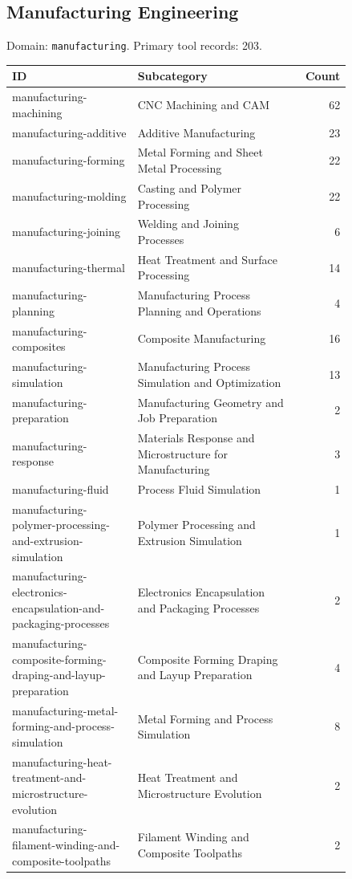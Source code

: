 \subsection{Manufacturing Engineering}
\noindent Domain: \texttt{manufacturing}. Primary tool records: 203.
\begin{longtable}{p{0.37\linewidth}p{0.47\linewidth}r}
ID & Subcategory & Count\\\hline\endhead
manufacturing-machining & CNC Machining and CAM & 62\\
manufacturing-additive & Additive Manufacturing & 23\\
manufacturing-forming & Metal Forming and Sheet Metal Processing & 22\\
manufacturing-molding & Casting and Polymer Processing & 22\\
manufacturing-joining & Welding and Joining Processes & 6\\
manufacturing-thermal & Heat Treatment and Surface Processing & 14\\
manufacturing-planning & Manufacturing Process Planning and Operations & 4\\
manufacturing-composites & Composite Manufacturing & 16\\
manufacturing-simulation & Manufacturing Process Simulation and Optimization & 13\\
manufacturing-preparation & Manufacturing Geometry and Job Preparation & 2\\
manufacturing-response & Materials Response and Microstructure for Manufacturing & 3\\
manufacturing-fluid & Process Fluid Simulation & 1\\
manufacturing-polymer-processing-and-extrusion-simulation & Polymer Processing and Extrusion Simulation & 1\\
manufacturing-electronics-encapsulation-and-packaging-processes & Electronics Encapsulation and Packaging Processes & 2\\
manufacturing-composite-forming-draping-and-layup-preparation & Composite Forming Draping and Layup Preparation & 4\\
manufacturing-metal-forming-and-process-simulation & Metal Forming and Process Simulation & 8\\
manufacturing-heat-treatment-and-microstructure-evolution & Heat Treatment and Microstructure Evolution & 2\\
manufacturing-filament-winding-and-composite-toolpaths & Filament Winding and Composite Toolpaths & 2\\

\end{longtable}
